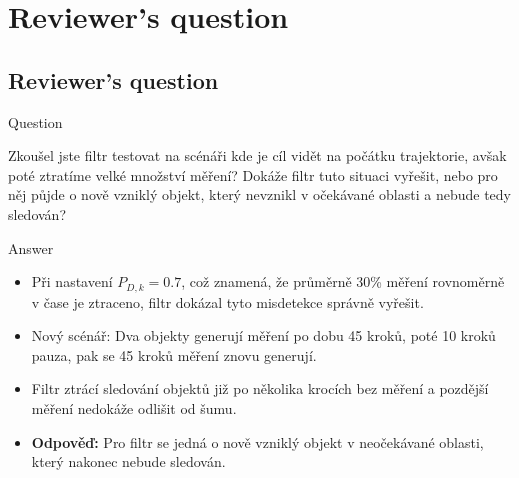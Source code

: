 \section{Reviewer's question}
\subsection*{Reviewer's question}

\begin{frame}
\begin{block}{Question}
\begin{otherlanguage}{czech}
Zkoušel jste filtr testovat na scénáři kde je cíl vidět na počátku trajektorie, avšak poté ztratíme velké množství měření? Dokáže filtr tuto situaci vyřešit, nebo pro něj půjde o nově vzniklý objekt, který nevznikl v očekávané oblasti a nebude tedy sledován?
\end{otherlanguage}
\end{block}
\begin{exampleblock}{Answer}
\begin{itemize}
    \item Při nastavení $P_{D,k}=0.7$, což znamená, že průměrně 30\% měření rovnoměrně v čase je ztraceno, filtr dokázal tyto misdetekce správně vyřešit.
    \item Nový scénář: Dva objekty generují měření po dobu 45 kroků, poté 10 kroků pauza, pak se 45 kroků měření znovu generují.
    \item Filtr ztrácí sledování objektů již po několika krocích bez měření a pozdější měření nedokáže odlišit od šumu.
    \item \textbf{Odpověď:} Pro filtr se jedná o nově vzniklý objekt v neočekávané oblasti, který nakonec nebude sledován.
\end{itemize}
\end{exampleblock}
\end{frame}

